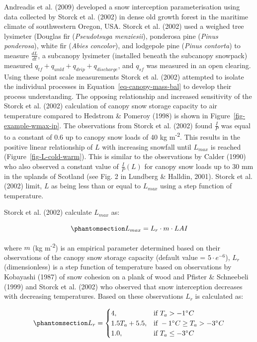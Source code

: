 \documentclass[
  letterpaper,
]{tex/uofsthesis-cs}
\begin{document}
Andreadis et al. (2009) developed a snow interception parameterisation
using data collected by Storck et al. (2002) in dense old growth forest
in the maritime climate of southwestern Oregon, USA. Storck et al.
(2002) used a weighed tree lysimeter (Douglas fir (\emph{Pseudotsuga
menziesii}), ponderosa pine (\emph{Pinus ponderosa}), white fir
(\emph{Abies concolor}), and lodgepole pine (\emph{Pinus contorta}) to
measure \(\frac{dL}{dt}\), a subcanopy lysimeter (installed beneath the
subcanopy snowpack) measured \(q_{tf}+q_{unld}+q_{drip}+q_{discharge}\),
and \(q_{sf}\) was measured in an open clearing. Using these point scale
measurements Storck et al. (2002) attempted to isolate the individual
processes in Equation~\ref{eq-canopy-mass-bal} to develop their process
understanding. The opposing relationship and increased sensitivity of
the Storck et al. (2002) calculation of canopy snow storage capacity to
air temperature compared to Hedstrom \& Pomeroy (1998) is shown in
Figure~\ref{fig-example-wmax-ip}. The observations from Storck et al.
(2002) found \(\frac{I}{P}\) was equal to a constant of 0.6 up to canopy
snow loads of 40 kg m\textsuperscript{-2}. This results in the positive
linear relationship of \(L\) with increasing snowfall until \(L_{max}\)
is reached (Figure~\ref{fig-L-cold-warm}). This is similar to the
observations by Calder (1990) who also observed a constant value of
\(\frac{I}{P}(L)\) for canopy snow loads up to 30 mm in the uplands of
Scotland (see Fig. 2 in Lundberg \& Halldin, 2001). Storck et al. (2002)
limit, \(L\) as being less than or equal to \(L_{max}\) using a step
function of temperature.

Storck et al. (2002) calculate \(L_{max}\) as:

\begin{equation}\phantomsection\label{eq-imax-storck-andreas}{
L_{max} = L_r \cdot m \cdot LAI
}\end{equation}

where \(m\) (kg m\textsuperscript{-2}) is an empirical parameter
determined based on their observations of the canopy snow storage
capacity (default value = \(5 \cdot e^{-6}\)), \(L_r\) (dimensionless)
is a step function of temperature based on observations by Kobayashi
(1987) of snow cohesion on a plank of wood and Pfister \& Schneebeli
(1999) and Storck et al. (2002) who observed that snow interception
decreases with decreasing temperatures. Based on these observations
\(L_r\) is calculated as:

\begin{equation}\phantomsection\label{eq-storck-andreas-lr}{
L_r = \begin{cases}
    4,& \text{if } T_a>-1 ^{\circ} C \\
    1.5 T_a+5.5,              & \text{if } -1 ^{\circ} C \geq T_a >-3 ^{\circ} C \\
        1.0,              & \text{if } T_a \leq -3 ^{\circ} C
\end{cases}
}\end{equation}
\end{document}
